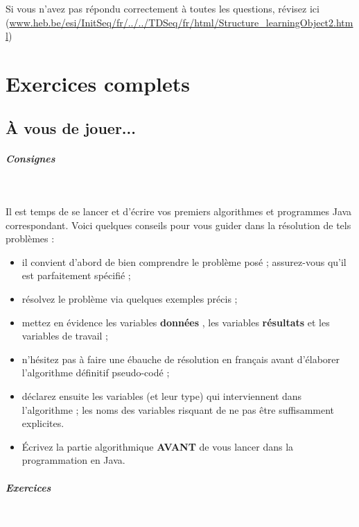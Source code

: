 \documentclass[11pt,a4paper]{article}
\begin{document}
				Si vous n'avez pas r\'epondu correctement \`a toutes les questions, 
        r\'evisez ici (\url{www.heb.be/esi/InitSeq/fr/../../TDSeq/fr/html/Structure\_learningObject2.html})
            \par
        \section{Exercices complets}\subsection{\`A vous de jouer...}
			
		\subparagraph{Consignes} 
		
					\textcolor{white}{.} \par
				
          Il est temps de se lancer et d'\'ecrire vos premiers algorithmes et programmes Java correspondant. 
          Voici quelques conseils pour vous guider dans la r\'esolution de tels probl\`emes :
          
					\begin{itemize}
				
			\item il convient d'abord de bien comprendre le probl\`eme pos\'e ; assurez-vous qu'il est parfaitement sp\'ecifi\'e ;
			\item r\'esolvez le probl\`eme via quelques exemples pr\'ecis ;
			\item mettez en \'evidence les variables \textbf{\guillemotleft  donn\'ees \guillemotright }, les variables \textbf{\guillemotleft  r\'esultats \guillemotright } et les variables de travail ;
			\item n'h\'esitez pas \`a faire une \'ebauche de r\'esolution en fran\c cais avant d'\'elaborer l'algorithme d\'efinitif pseudo-cod\'e ;
			\item d\'eclarez ensuite les variables (et leur type) qui interviennent dans l'algorithme ; les noms des variables risquant de ne pas \^etre suffisamment explicites.
			\item \'Ecrivez la partie algorithmique \textbf{AVANT} de vous lancer dans la programmation en Java.
					\end{itemize}
				
            \par
        
			
		\subparagraph{Exercices} 
		
					\textcolor{white}{.} \par
				
\end{document}

